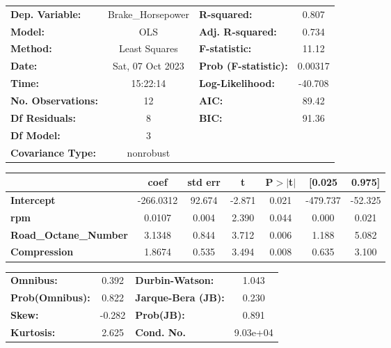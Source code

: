 \documentclass[11pt]{article}
\begin{document}
    \begin{center}
\begin{tabular}{lclc}
\toprule
\textbf{Dep. Variable:}       & Brake\_Horsepower & \textbf{  R-squared:         } &     0.807   \\
\textbf{Model:}               &        OLS        & \textbf{  Adj. R-squared:    } &     0.734   \\
\textbf{Method:}              &   Least Squares   & \textbf{  F-statistic:       } &     11.12   \\
\textbf{Date:}                &  Sat, 07 Oct 2023 & \textbf{  Prob (F-statistic):} &  0.00317    \\
\textbf{Time:}                &      15:22:14     & \textbf{  Log-Likelihood:    } &   -40.708   \\
\textbf{No. Observations:}    &           12      & \textbf{  AIC:               } &     89.42   \\
\textbf{Df Residuals:}        &            8      & \textbf{  BIC:               } &     91.36   \\
\textbf{Df Model:}            &            3      & \textbf{                     } &             \\
\textbf{Covariance Type:}     &     nonrobust     & \textbf{                     } &             \\
\bottomrule
\end{tabular}
\begin{tabular}{lcccccc}
                              & \textbf{coef} & \textbf{std err} & \textbf{t} & \textbf{P$> |$t$|$} & \textbf{[0.025} & \textbf{0.975]}  \\
\midrule
\textbf{Intercept}            &    -266.0312  &       92.674     &    -2.871  &         0.021        &     -479.737    &      -52.325     \\
\textbf{rpm}                  &       0.0107  &        0.004     &     2.390  &         0.044        &        0.000    &        0.021     \\
\textbf{Road\_Octane\_Number} &       3.1348  &        0.844     &     3.712  &         0.006        &        1.188    &        5.082     \\
\textbf{Compression}          &       1.8674  &        0.535     &     3.494  &         0.008        &        0.635    &        3.100     \\
\bottomrule
\end{tabular}
\begin{tabular}{lclc}
\textbf{Omnibus:}       &  0.392 & \textbf{  Durbin-Watson:     } &    1.043  \\
\textbf{Prob(Omnibus):} &  0.822 & \textbf{  Jarque-Bera (JB):  } &    0.230  \\
\textbf{Skew:}          & -0.282 & \textbf{  Prob(JB):          } &    0.891  \\
\textbf{Kurtosis:}      &  2.625 & \textbf{  Cond. No.          } & 9.03e+04  \\
\bottomrule
\end{tabular}
\end{center}
\end{document}
